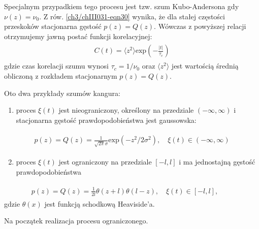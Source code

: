 \documentclass[a4paper,12pt,polish]{sphinxmanual}
\begin{document}
Specjalnym przypadkiem tego procesu jest tzw. szum Kubo-Andersona gdy $\nu(z) = \nu_0$. Z rów. \eqref{ch3/chIII031-eqn30} wynika, że dla stałej częstości przeskoków stacjonarna gęstość $p(z) = Q(z)$. Wówczas z powyższej relacji otrzymujemy jawną postać funkcji korelacyjnej:
\label{ch3/chIII031:equation-eqn32}\begin{gather}
\begin{split}C(t) = \langle z^2 \rangle \mbox{exp}\left(-\frac{\vert t\vert}{\tau_c}\right)\end{split}\label{ch3/chIII031-eqn32}
\end{gather}
gdzie czas korelacji szumu wynosi $\tau_c = 1/\nu_0$ oraz $\langle z^2 \rangle$ jest wartością średnią obliczoną z rozkładem stacjonarnym $p(z) = Q(z)$.

Oto dwa przykłady szumów kangura:
\begin{enumerate}
\item {} 
proces $\xi(t)$ jest nieograniczony, określony na przedziale $(-\infty, \infty)$ i stacjonarna gęstość prawdopodobieństwa jest gaussowska:

\end{enumerate}
\label{ch3/chIII031:equation-eqn33}\begin{gather}
\begin{split}p(z) = Q(z) = \frac{1}{\sqrt{2\pi} \sigma} \mbox{exp}(-z^2/2\sigma^2), \quad \xi(t) \in (-\infty, \infty)\end{split}\label{ch3/chIII031-eqn33}
\end{gather}\begin{enumerate}
\setcounter{enumi}{1}
\item {} 
proces $\xi(t)$ jest ograniczony na przedziale $[-l, l]$ i ma jednostajną gęstość prawdopodobieństwa

\end{enumerate}
\label{ch3/chIII031:equation-eqn34}\begin{gather}
\begin{split}p(z) = Q(z) = \frac{1}{2l}\theta(z+l)\theta(l-z),\quad \xi(t) \in [-l, l], \qquad\end{split}\label{ch3/chIII031-eqn34}
\end{gather}
gdzie $\theta(x)$ jest funkcją schodkową Heaviside'a.

Na początek realizacja procesu ograniczonego.
\end{document}

